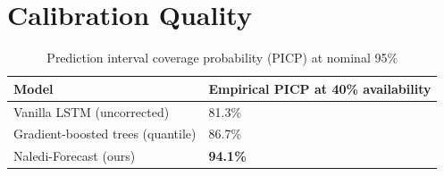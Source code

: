 \section{Calibration Quality}
\begin{table}[htbp]
\centering
\caption{Prediction interval coverage probability (PICP) at nominal 95\%}
\label{tab:picp}
\begin{tabularx}{\linewidth}{@{}lX@{}}
\toprule
\textbf{Model} & \textbf{Empirical PICP at 40\% availability} \\
\midrule
Vanilla LSTM (uncorrected) & 81.3\% \\
Gradient-boosted trees (quantile) & 86.7\% \\
\rowcolor{witssand} Naledi-Forecast (ours) & \textbf{94.1\%} \\
\bottomrule
\end{tabularx}
\end{table}
